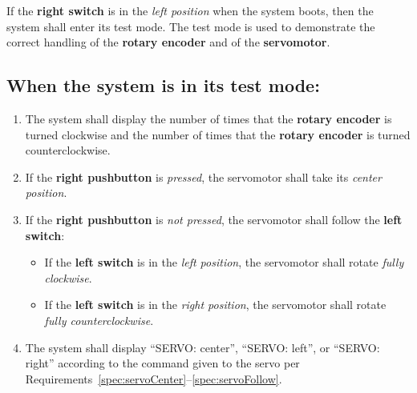If the \textbf{right switch} is in the \textit{left position} when the system boots, then the system shall enter its test mode.
The test mode is used to demonstrate the correct handling of the \textbf{rotary encoder} and of the \textbf{servomotor}.

\subsection*{When the system is in its test mode:}
\begin{enumerate}
    \item \label{spec:encoderCounts} The system shall display the number of times that the \textbf{rotary encoder} is turned clockwise and the number of times that the \textbf{rotary encoder} is turned counterclockwise.
    \item \label{spec:servoCenter} If the \textbf{right pushbutton} is \textit{pressed}, the servomotor shall take its \textit{center position}.
    \item \label{spec:servoFollow} If the \textbf{right pushbutton} is \textit{not pressed}, the servomotor shall follow the \textbf{left switch}:
        \begin{itemize}
            \item If the \textbf{left switch} is in the \textit{left position}, the servomotor shall rotate \textit{fully clockwise}.
            \item If the \textbf{left switch} is in the \textit{right position}, the servomotor shall rotate \textit{fully counterclockwise}.
        \end{itemize}
    \item \label{spec:servoString} The system shall display ``SERVO: center'', ``SERVO: left'', or ``SERVO: right'' according to the command given to the servo per Requirements~\ref{spec:servoCenter}--\ref{spec:servoFollow}.
\end{enumerate}
